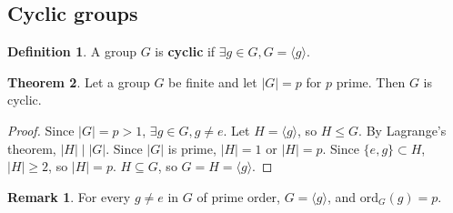 \documentclass[12pt,a4paper]{article}
\theoremstyle{definition}
\newtheorem{definition}{Definition}[subsection]
\newtheorem{theorem}[definition]{Theorem}
\newtheorem*{remark}{Remark}
\begin{document}
\subsection{Cyclic groups}

\begin{definition}
	A group $G$ is \textbf{cyclic} if $\exists g \in G, G = \langle g \rangle$.
\end{definition}

\begin{theorem}
	Let a group $G$ be finite and let $|G| = p$ for $p$ prime. Then $G$ is cyclic.
\end{theorem}

\begin{proof}
	Since $|G| = p > 1$, $\exists g \in G, g \ne e$. Let $H = \langle g \rangle$, so $H \le G$. By Lagrange's theorem, $|H| \mid |G|$. Since $|G|$ is prime, $|H| = 1$ or $|H| = p$. Since $\{ e, g \} \subset H$, $|H| \ge 2$, so $|H| = p$. $H \subseteq G$, so $G = H = \langle g \rangle$.
\end{proof}

\begin{remark}
	For every $g \ne e$ in $G$ of prime order, $G = \langle g \rangle$, and $\text{ord}_G(g) = p$.
\end{remark}
	
\end{document}
